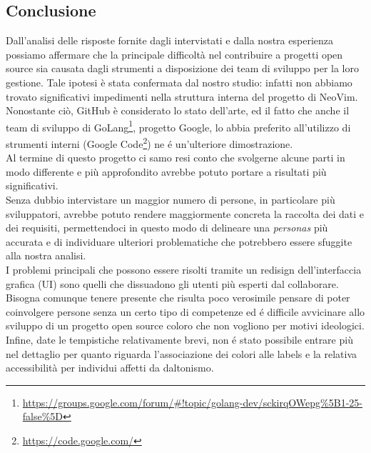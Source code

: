 \documentclass[12pt]{article} %
\begin{document}
\subsection{Conclusione}
Dall'analisi delle risposte fornite dagli intervistati e dalla nostra esperienza possiamo affermare che la principale difficolt\`a nel contribuire a progetti open source sia causata dagli strumenti a disposizione dei team di sviluppo per la loro gestione. Tale ipotesi \`e stata confermata dal nostro studio: infatti non abbiamo trovato significativi impedimenti nella struttura interna del progetto di NeoVim.\\
Nonostante ci\`o, GitHub \`e considerato lo stato dell'arte, ed il fatto che anche il team di sviluppo di GoLang\footnote{\url{https://groups.google.com/forum/#!topic/golang-dev/sckirqOWepg\%5B1-25-false\%5D}}, progetto Google, lo abbia preferito all'utilizzo di strumenti interni (Google Code\footnote{\url{https://code.google.com/}}) ne \'e un'ulteriore dimostrazione.\\
Al termine di questo progetto ci samo resi conto che svolgerne alcune parti in modo differente e pi\`u approfondito avrebbe potuto portare a risultati pi\`u significativi.\\
Senza dubbio intervistare un maggior numero di persone, in particolare pi\`u sviluppatori, avrebbe potuto rendere maggiormente concreta la raccolta dei dati e dei requisiti, permettendoci in questo modo di delineare una \emph{personas} pi\`u accurata e di individuare ulteriori problematiche che potrebbero essere sfuggite alla nostra analisi.\\
I problemi principali che possono essere risolti tramite un redisign dell'interfaccia grafica (UI) sono quelli che dissuadono gli utenti pi\`u esperti dal collaborare. Bisogna comunque tenere presente che risulta poco verosimile pensare di poter coinvolgere persone senza un certo tipo di competenze ed \'e difficile avvicinare allo sviluppo di un progetto open source coloro che non vogliono per motivi ideologici.\\
Infine, date le tempistiche relativamente brevi, non \'e stato possibile entrare pi\`u nel dettaglio per quanto riguarda l'associazione dei colori alle labels e la relativa accessibilit\`a per individui affetti da daltonismo.


\newpage


\end{document}
